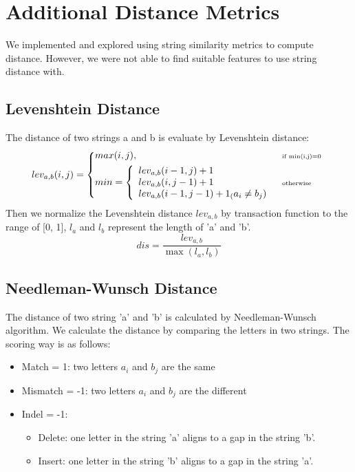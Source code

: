 \documentclass{article}
\begin{document}
\section{Additional Distance Metrics}
\label{additional-distance-metrics}

We implemented and explored using string similarity metrics to compute distance.
However, we were not able to find suitable features to use string distance with.

\subsection{Levenshtein Distance}
The distance of two strings a and b is evaluate by Levenshtein distance:
\begin{equation}
  lev_{a,b}(i,j) = \left \{
  \begin{aligned}
    &max(i,j), && \text{\tiny if min(i,j)=0}\  \\
    &
    min= \left\{
    \begin{array}{ll}
    lev_{a,b}(i-1,j)+1\\
    lev_{a,b}(i,j-1)+1\\
    lev_{a,b}(i-1,j-1)+1_(a_{i}\not=b_{j})
    \end{array}\right.
    && \text{\tiny otherwise}
  \end{aligned} \right.
\end{equation}
Then we normalize the Levenshtein distance $lev_{a,b}$ by transaction function to the range of [0, 1], $l_{a}$ and $l_{b}$ represent the length of 'a' and 'b'.
$$dis = \frac{lev_{a,b}}{{\max}(l_{a}, l_{b})}  $$

\subsection{Needleman-Wunsch Distance}
The distance of two string 'a' and 'b' is calculated by Needleman-Wunsch algorithm. We calculate the distance by comparing the letters in two strings. The scoring way is as follows:
\begin{itemize}
  \item  Match = 1: two letters $a_{i}$ and $b_{j}$ are the same 
  \item  Mismatch = -1: two letters $a_{i}$ and $b_{j}$ are the different 
  \item  Indel = -1:
  \begin{itemize}
  	\item Delete: one letter in the string 'a' aligns to a gap in the string 'b'.
    \item Insert: one letter in the string 'b' aligns to a gap in the string 'a'.
  \end{itemize}
  		
\end{itemize}
\end{document}
